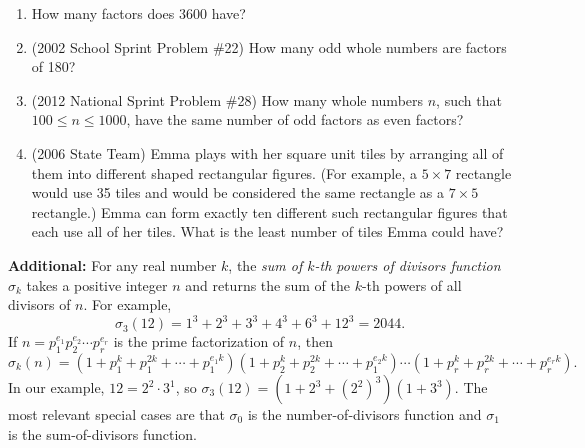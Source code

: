 \documentclass{article}
\begin{document}
\begin{enumerate}
\item How many factors does 3600 have?\vspace{2cm}
\item (2002 School Sprint Problem \#22) How many odd whole numbers are factors of 180?\vspace{2cm}
\item (2012 National Sprint Problem \#28) How many whole numbers $n$, such that $100\leq n\leq 1000$, have the same number of odd factors as even factors?\vspace{2cm}
\item (2006 State Team) Emma plays with her square unit tiles by arranging all of them into different shaped rectangular figures. (For example, a $5\times 7$ rectangle would use 35 tiles and would be considered the same rectangle as a $7\times 5$ rectangle.) Emma can form exactly ten different such rectangular figures that each use all of her tiles. What is the least number of tiles Emma could have?\vspace{2cm}
\end{enumerate}
\textbf{Additional:} For any real number $k$, the \emph{sum of $k$-th powers of divisors function $\sigma_k$} takes a positive integer $n$ and returns the sum of the $k$-th powers of all divisors of $n$. For example,
\begin{equation*}
\sigma_3(12) = 1^3 + 2^3 + 3^3 + 4^3 + 6^3 + 12^3 = 2044.
\end{equation*}
If $n = p_1^{e_1}p_2^{e_2}\cdots p_r^{e_r}$ is the prime factorization of $n$, then
\begin{equation*}
\boxed{\sigma_k(n) = (1 + p_1^k + p_1^{2k} + \cdots + p_1^{e_1k})(1 + p_2^k + p_2^{2k} + \cdots + p_1^{e_2k})\cdots (1 + p_r^k + p_r^{2k} + \cdots + p_r^{e_rk}).}
\end{equation*}
In our example, $12 = 2^2\cdot 3^1$, so $\sigma_3(12) = (1 + 2^3 + (2^2)^3)(1 + 3^3)$. The most relevant special cases are that $\sigma_0$ is the number-of-divisors function and $\sigma_1$ is the sum-of-divisors function.


\newpage
\end{document}
